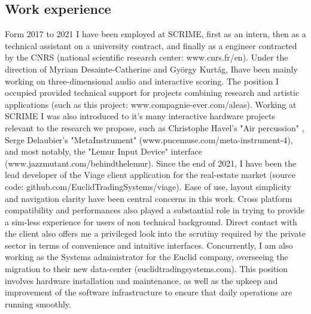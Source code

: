 \documentclass[journal,onecolumn]{IEEEtran}
\begin{document}
\subsection{Work experience} %
Form 2017 to 2021 I have been employed at SCRIME, first as an intern, then as a technical assistant on a university contract, and finally as a engineer contracted by the CNRS (national scientific research center: www.cnrs.fr/en). Under the direction of Myriam Desainte-Catherine and György Kurtág, Ihave been mainly working on three-dimensional audio and interactive scoring. The position I occupied provided technical support for projects combining research and artistic applications (such as this project: www.compagnie-ever.com/aleas). Working at SCRIME I was also introduced to it's many interactive hardware projects relevant to the research we propose, such as Christophe Havel's "Air percussion" \cite{havel:air}, Serge Delaubier's "MetaInstrument" (www.pucemuse.com/meta-instrument-4), and most notably, the "Lemur Input Device" interface (www.jazzmutant.com/behindthelemur).
Since the end of 2021, I have been the lead developer of the Viage client application for the real-estate market (source code: github.com/EuclidTradingSystems/viage). Ease of use, layout simplicity and navigation clarity have been central concerns in this work. Cross platform compatibility and performances also played a substantial role in trying to provide a sim-less experience for users of non technical background. Direct contact with the client also offers me a privileged look into the scrutiny required by the private sector in terms of convenience and intuitive interfaces. Concurrently, I am also working as the Systems administrator for the Euclid company, overseeing the migration to their new data-center (euclidtradingsystems.com). This position involves hardware installation and maintenance, as well as the upkeep and improvement of the software infrastructure to ensure that daily operations are running smoothly. 
\end{document}
